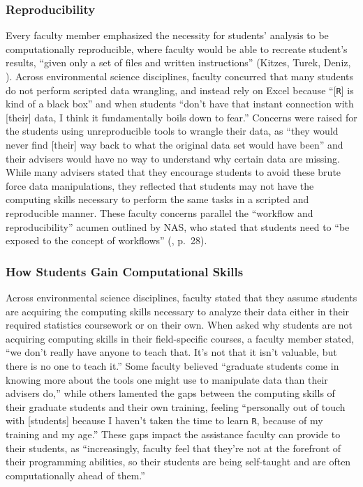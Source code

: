 \documentclass[12pt]{article}
\begin{document}
\subsubsection{Reproducibility}  

\noindent Every faculty member emphasized the necessity for students' analysis
to be computationally reproducible, where faculty would be able to recreate 
student's results, ``given only a set of files and written instructions''
(Kitzes, Turek, Deniz, \citeyear{reproducible}). Across environmental science
disciplines, faculty concurred that many students do not perform scripted data
wrangling, and instead rely on Excel because ``[\texttt{R}] is kind of a black
box'' and when students ``don't have that instant connection with [their] data,
I think it fundamentally boils down to fear.'' Concerns were raised for the
students using unreproducible tools to wrangle their data, as ``they would never
find [their] way back to what the original data set would have been'' and their
advisers would have no way to understand why certain data are missing. While
many advisers stated that they encourage students to avoid these brute force
data manipulations, they reflected that students may not have the computing
skills necessary to perform the same tasks in a scripted and reproducible
manner. These faculty concerns parallel the ``workflow and reproducibility''
acumen outlined by NAS, who stated that students need to ``be exposed to the
concept of workflows'' (\citeyear{nas}, p.\ 28). 

\subsubsection{How Students Gain Computational Skills}

\noindent Across environmental science disciplines, faculty stated that they 
assume students are acquiring the computing skills necessary to analyze their 
data either in their required statistics coursework or on their own. When asked
why students are not acquiring computing skills in their field-specific courses,
a faculty member stated, ``we don't really have anyone to teach that. It's not
that it isn't valuable, but there is no one to teach it.'' Some faculty believed
``graduate students come in knowing more about the tools one might use to
manipulate data than their advisers do,'' while others lamented the gaps between
the computing skills of their graduate students and their own training,
feeling ``personally out of touch with [students] because I haven't taken the
time to learn \texttt{R}, because of my training and my age.'' These gaps impact
the assistance faculty can provide to their students, as ``increasingly, faculty
feel that they're not at the forefront of their programming abilities, so their
students are being self-taught and are often computationally ahead of them.''
\end{document}
